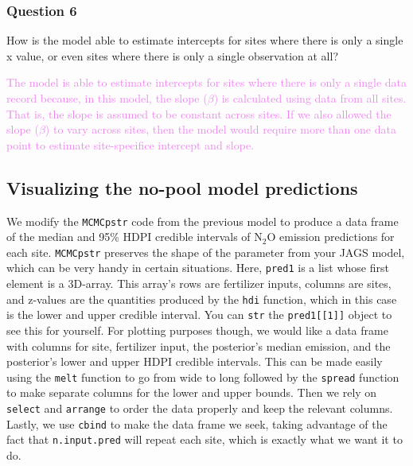 \documentclass[
]{article}
\begin{document}
\hypertarget{question-6-1}{%
\subsubsection{Question 6}\label{question-6-1}}

How is the model able to estimate intercepts for sites where there is
only a single x value, or even sites where there is only a single
observation at all?

\textcolor{violet}{The model is able to estimate intercepts for sites where there is only a single data record because, in this model, the slope ($\beta$) is calculated using data from all sites. That is, the slope is assumed to be constant across sites. If we also allowed the slope ($\beta$) to vary across sites, then the model would require more than one data point to estimate site-specifice intercept and slope.}

\hypertarget{visualizing-the-no-pool-model-predictions}{%
\subsection{Visualizing the no-pool model
predictions}\label{visualizing-the-no-pool-model-predictions}}

We modify the \texttt{MCMCpstr} code from the previous model to produce
a data frame of the median and 95\% HDPI credible intervals of
\(\textrm{N} _2 \textrm{O}\) emission predictions for each site.
\texttt{MCMCpstr} preserves the shape of the parameter from your JAGS
model, which can be very handy in certain situations. Here,
\texttt{pred1} is a list whose first element is a 3D-array. This array's
rows are fertilizer inputs, columns are sites, and z-values are the
quantities produced by the \texttt{hdi} function, which in this case is
the lower and upper credible interval. You can \texttt{str} the
\texttt{pred1{[}{[}1{]}{]}} object to see this for yourself. For
plotting purposes though, we would like a data frame with columns for
site, fertilizer input, the posterior's median emission, and the
posterior's lower and upper HDPI credible intervals. This can be made
easily using the \texttt{melt} function to go from wide to long followed
by the \texttt{spread} function to make separate columns for the lower
and upper bounds. Then we rely on \texttt{select} and \texttt{arrange}
to order the data properly and keep the relevant columns. Lastly, we use
\texttt{cbind} to make the data frame we seek, taking advantage of the
fact that \texttt{n.input.pred} will repeat each site, which is exactly
what we want it to do.
\end{document}
